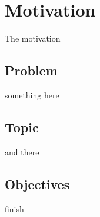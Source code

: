 \section{Motivation}
The motivation

\subsection{Problem}
something here

\subsection{Topic}
and there

\subsection{Objectives}
finish
